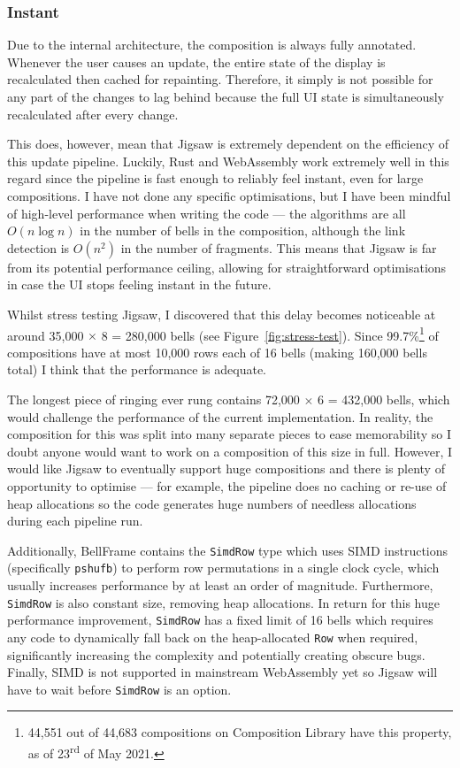 \documentclass[12pt]{article}
\newcommand{\nth}[2]{#1\textsuperscript{#2}}
\begin{document}
\subsubsection{Instant}

Due to the internal architecture, the composition is always fully annotated.  Whenever the user
causes an update, the entire state of the display is recalculated then cached for repainting.
Therefore, it simply is not possible for any part of the changes to lag behind because the full UI
state is simultaneously recalculated after every change.

This does, however, mean that Jigsaw is extremely dependent on the efficiency of this update
pipeline.  Luckily, Rust and WebAssembly work extremely well in this regard since the
pipeline is fast enough to reliably feel instant, even for large compositions.  I have not done any
specific optimisations, but I have been mindful of high-level performance when writing the code
--- the algorithms are all $O(n \log n)$ in the number of bells in the composition, although the
link detection is $O(n^2)$ in the number of fragments.  This means that Jigsaw is far from its
potential performance ceiling, allowing for straightforward optimisations in case the UI stops
feeling instant in the future.

Whilst stress testing Jigsaw, I discovered that this delay becomes noticeable at around 35,000
$\times$ 8 = 280,000 bells (see Figure~\ref{fig:stress-test}).  Since 99.7\%\footnote{44,551 out of
44,683 compositions on Composition Library have this property, as of \nth{23}{rd} of May 2021.} of
compositions have at most 10,000 rows each of 16 bells (making 160,000 bells total) I think that the
performance is adequate.

The longest piece of ringing ever rung contains 72,000 $\times$ 6 = 432,000 bells, which would
challenge the performance of the current implementation.  In reality, the composition for this was
split into many separate pieces to ease memorability so I doubt anyone would want to work on a
composition of this size in full.  However, I would like Jigsaw to eventually support huge
compositions and there is plenty of opportunity to optimise --- for example, the pipeline does no
caching or re-use of heap allocations so the code generates huge numbers of needless allocations
during each pipeline run.

Additionally, BellFrame contains the \verb|SimdRow| type which uses SIMD instructions
(specifically \verb|pshufb|) to perform row permutations in a single clock cycle, which usually
increases performance by at least an order of magnitude.  Furthermore, \verb|SimdRow| is also
constant size, removing heap allocations.  In return for this huge performance improvement,
\verb|SimdRow| has a fixed limit of 16 bells which requires any code to dynamically fall back on the
heap-allocated \verb|Row| when required, significantly increasing the complexity and potentially
creating obscure bugs.  Finally, SIMD is not supported in mainstream WebAssembly yet so Jigsaw will
have to wait before \verb|SimdRow| is an option.
\end{document}
